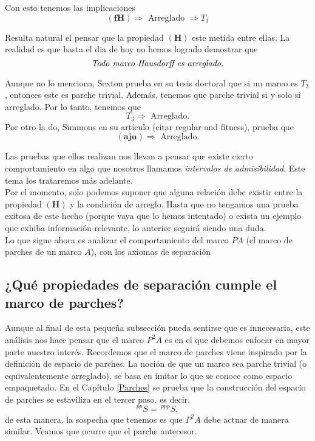 Con esto tenemos las implicaciones
\[
\mathbf{(fH)} \Rightarrow \mbox{ Arreglado }\Rightarrow T_1
\]

Resulta natural el pensar que la propiedad $\mathbf{(H)}$ este metida entre ellas. La realidad es que hasta el dia de hoy no hemos logrado demostrar que 
\[
\mbox{\emph{Todo marco Hausdorff es arreglado.}}
\]

Aunque no lo menciona, Sexton prueba en su tesis doctoral que si un marco es $T_3$, entonces este es parche trivial. Además, tenemos que parche trivial si y solo si arreglado. Por lo tanto, tenemos que
\[
T_3\Rightarrow \mbox{ Arreglado.}
\] 
Por otro la
do, Simmons en su artículo (citar regular and fitness), prueba que 
\[
\mathbf{(aju)}\Rightarrow \mbox{ Arreglado.}
\]

Las pruebas que ellos realizan nos llevan a pensar que existe cierto comportamiento en algo que nosotros llamamos \emph{intervalos de admisibilidad}. Este tema los trataremos más adelante.\\

Por el momento, solo podemos suponer que alguna relación debe existir entre la propiedad $\mathbf{(H)}$ y la condición de arreglo. Hasta que no tengamos una prueba exitosa de este hecho (porque vaya que lo hemos intentado) o exista un ejemplo que exhiba información relevante,
lo anterior seguirá siendo una duda.\\

Lo que sigue ahora es analizar el comportamiento del marco $PA$ (el marco de parches de un marco $A$), con los axiomas de separación

\subsection{¿Qué propiedades de separación cumple el marco de parches?}\label{Parchesyseparación}

Aunque al final de esta pequeña subsección pueda sentirse que es innecesaria, este análisis nos hace pensar que el marco $P^2A$ es en el que debemos enfocar en mayor parte nuestro interés. Recordemos que el marco de parches viene inspirado por la definición de espacio de parches.
La noción de que un marco sea parche trivial (o equivalentemente arreglado), se basa en imitar lo que se conoce como espacio empaquetado. En el Capítulo \ref{Parches} se prueba que la construcción del espacio de parches se estaviliza en el tercer paso, es decir,
\[
^{pp}S=\,^{ppp}S,
\]
de esta manera, la sospecha que tenemos es que $P^2A$ debe actuar de manera similar. Veamos que ocurre que el parche antecesor.\\

